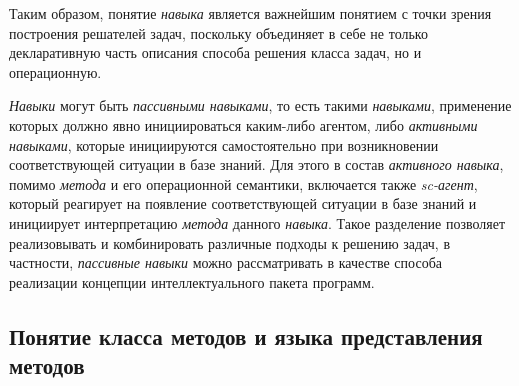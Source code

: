 \begin{SCn}

	\begin{scnsubdividing}
		\begin{scnindent}
		\end{scnindent}
	\end{scnsubdividing}
\end{SCn}

Таким образом, понятие \textit{навыка} является важнейшим понятием с точки зрения построения решателей задач, поскольку объединяет в себе не только декларативную часть описания способа решения класса задач, но и операционную.

\textit{Навыки} могут быть \textit{пассивными навыками}, то есть такими \textit{навыками}, применение которых должно явно инициироваться каким-либо агентом, либо \textit{активными навыками}, которые инициируются самостоятельно при возникновении соответствующей ситуации в базе знаний. Для этого в состав \textit{активного навыка}, помимо \textit{метода} и его операционной семантики, включается также \textit{sc-агент}, который реагирует на появление соответствующей ситуации в базе знаний и инициирует интерпретацию \textit{метода} данного \textit{навыка}.
Такое разделение позволяет реализовывать и комбинировать различные подходы к решению задач, в частности, \textit{пассивные навыки} можно рассматривать в качестве способа реализации концепции интеллектуального пакета программ.

\subsection{Понятие класса методов и языка представления методов}
\label{subsec_method_lang_concept}


